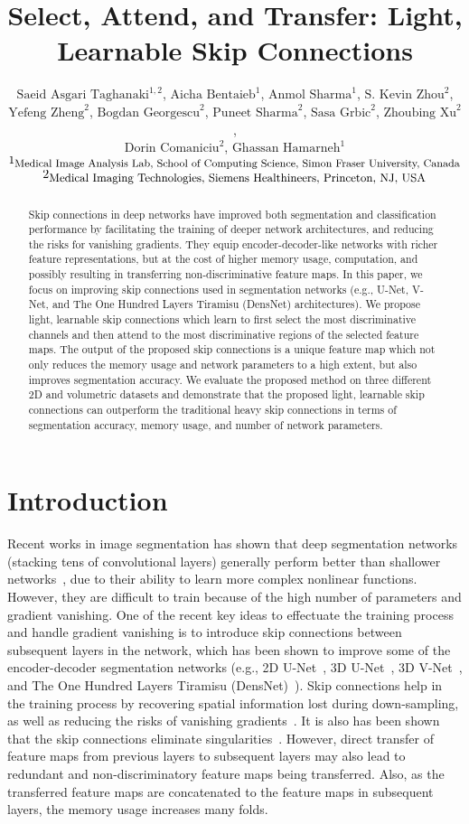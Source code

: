 \documentclass{article}
\title{Select, Attend, and Transfer: Light, Learnable Skip Connections}
\author{
$\text{Saeid Asgari Taghanaki}^{1,2}$, $\text{Aicha Bentaieb}^{1}$, $\text{Anmol Sharma}^{1}$, $\text{S. Kevin Zhou}^{2}$, \\ \textbf{$\text{Yefeng Zheng}^{2}$}, \textbf{$\text{Bogdan Georgescu}^{2}$}, \textbf{$\text{Puneet Sharma}^{2}$}, \textbf{$\text{Sasa Grbic}^{2}$}, \textbf{$\text{Zhoubing Xu}^{2}$}, \\ \textbf{$\text{Dorin Comaniciu}^{2}$}, \textbf{$\text{Ghassan Hamarneh}^{1}$} \\
    $\scriptsize{1} _\text{\small{Medical Image Analysis Lab, School of Computing Science, Simon Fraser University, Canada}}$ \\
    $\scriptsize{2} _\text{\small{Medical Imaging Technologies, Siemens Healthineers, Princeton, NJ, USA}}$
}
\begin{document}
\maketitle

\begin{abstract}
  Skip connections in deep networks have improved both segmentation and classification performance by facilitating the training of deeper network architectures, and reducing the risks for vanishing gradients. They equip encoder-decoder-like networks with richer feature representations, but at the cost of higher memory usage, computation, and possibly resulting in transferring non-discriminative feature maps. In this paper, we focus on improving  skip connections used in segmentation networks (e.g., U-Net, V-Net, and The One Hundred Layers Tiramisu (DensNet) architectures). We propose light, learnable skip connections which learn to first select the most discriminative channels and then attend to the most discriminative regions of the selected feature maps. The output of the proposed skip connections is a unique feature map which not only reduces the memory usage and network parameters to a high extent, but also improves segmentation accuracy. We evaluate the proposed method on three different 2D and volumetric datasets and demonstrate that the proposed light, learnable skip connections can outperform the traditional heavy skip connections in terms of segmentation accuracy, memory usage, and number of network parameters.
\end{abstract}

\section{Introduction}


Recent works in image segmentation has shown that deep segmentation networks (stacking tens of convolutional layers) generally perform better than shallower networks~\cite{he2016deep}, due to their ability to learn more complex nonlinear functions. However, they are difficult to train because of the high number of parameters and gradient vanishing. One of the recent key ideas to effectuate the training process and handle gradient vanishing is to introduce skip connections between subsequent layers in the network, which has been shown to improve some of the encoder-decoder segmentation networks (e.g., 2D U-Net~\cite{ronneberger2015u}, 3D U-Net~\cite{cciccek20163d}, 3D V-Net~\cite{milletari2016v}, and The One Hundred Layers Tiramisu (DensNet)~\cite{jegou2017one}). Skip connections help in the training process by recovering spatial information lost during down-sampling, as well as reducing the risks of vanishing gradients~\cite{huang2017densely}. It is also has been shown that the skip connections eliminate singularities~\cite{orhan2017skip}. However, direct transfer of feature maps from previous layers to subsequent layers may also lead to redundant and non-discriminatory feature maps being transferred. Also, as the transferred feature maps are concatenated to the feature maps in subsequent layers, the memory usage increases many folds.
\end{document}
